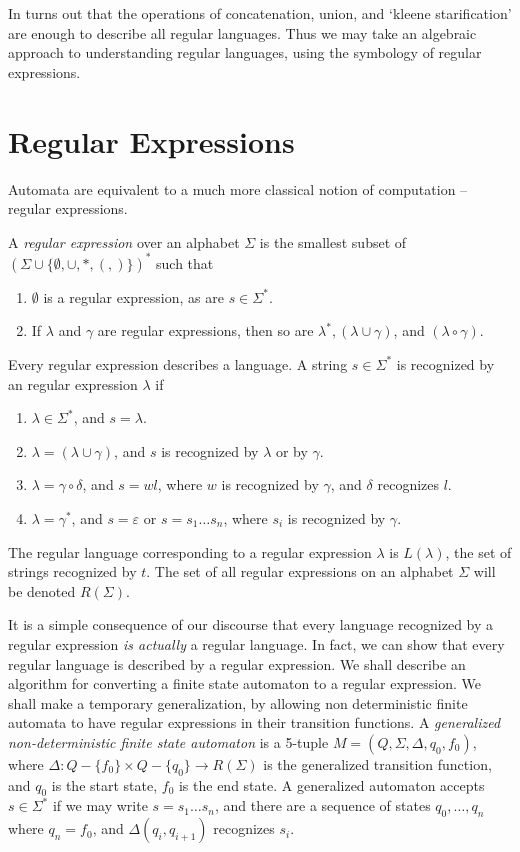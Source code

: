 In turns out that the operations of concatenation, union, and `kleene starification' are enough to describe all regular languages. Thus we may take an algebraic approach to understanding regular languages, using the symbology of regular expressions.

\section{Regular Expressions}

Automata are equivalent to a much more classical notion of computation -- regular expressions.

\begin{definition}
    A \emph{regular expression} over an alphabet $\Sigma$ is the smallest subset of $(\Sigma \cup \{ \emptyset, \cup, *, (, ) \})^*$ such that
    \begin{enumerate}
        \item $\emptyset$ is a regular expression, as are $s \in \Sigma^*$.
        \item If $\lambda$ and $\gamma$ are regular expressions, then so are $\lambda^*, (\lambda \cup \gamma)$, and $(\lambda \circ \gamma)$.
    \end{enumerate}
\end{definition}
%
Every regular expression describes a language. A string $s \in \Sigma^*$ is recognized by an regular expression $\lambda$ if
%
\begin{enumerate}
    \item $\lambda \in \Sigma^*$, and $s = \lambda$.
    \item $\lambda = (\lambda \cup \gamma)$, and $s$ is recognized by $\lambda$ or by $\gamma$.
    \item $\lambda = \gamma \circ \delta$, and $s = wl$, where $w$ is recognized by $\gamma$, and $\delta$ recognizes $l$.
    \item $\lambda = \gamma^*$, and $s = \varepsilon$ or $s = s_1 \dots s_n$, where $s_i$ is recognized by $\gamma$.
\end{enumerate}
%
The regular language corresponding to a regular expression $\lambda$ is $L(\lambda)$, the set of strings recognized by $t$. The set of all regular expressions on an alphabet $\Sigma$ will be denoted $R(\Sigma)$.

It is a simple consequence of our discourse that every language recognized by a regular expression {\it is actually} a regular language. In fact, we can show that every regular language is described by a regular expression. We shall describe an algorithm for converting a finite state automaton to a regular expression. We shall make a temporary generalization, by allowing non deterministic finite automata to have regular expressions in their transition functions. A \emph{generalized non-deterministic finite state automaton} is a 5-tuple $M = (Q,\Sigma, \Delta, q_0, f_0)$, where $\Delta: Q - \{ f_0 \} \times Q - \{ q_0 \} \to R(\Sigma)$ is the generalized transition function, and $q_0$ is the start state, $f_0$ is the end state. A generalized automaton accepts  $s \in \Sigma^*$ if we may write $s = s_1 \dots s_n$, and there are a sequence of states $q_0, \dots, q_n$ where $q_n = f_0$, and $\Delta(q_i, q_{i+1})$ recognizes $s_i$.

